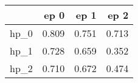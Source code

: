 \begin{tabular}{lrrr}
\toprule
{} &   ep 0 &   ep 1 &   ep 2 \\
\midrule
hp\_0 &  0.809 &  0.751 &  0.713 \\
hp\_1 &  0.728 &  0.659 &  0.352 \\
hp\_2 &  0.710 &  0.672 &  0.474 \\
\bottomrule
\end{tabular}
